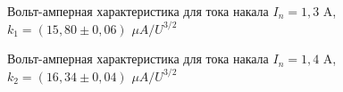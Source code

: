 \documentclass[a4paper,12pt]{article}
\begin{document}
\begin{figure} 
	\centering
	\caption{Вольт-амперная характеристика для тока накала $I_n = 1,3$ A, $k_1 = (15,80 \pm 0,06)$ $\mu A/U^{3/2}$}
	\label{mah}
\end{figure}

\begin{figure} 
	\centering
	\caption{Вольт-амперная характеристика для тока накала $I_n = 1,4$ A, $k_2 = (16,34 \pm 0,04)$ $\mu A/U^{3/2}$}
	\label{mah}
\end{figure}
\end{document}
